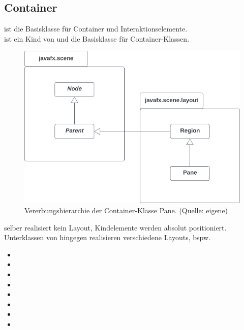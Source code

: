 \subsection{Container}

 ist die Basisklasse für Container und Interaktionselemente.\\

\noindent
{} ist ein Kind von  und die Basisklasse für Container-Klassen.

\begin{figure}
    \centering
    \includegraphics[scale=0.5]{chapters/fopt3/img/javafx/pane}
    \caption{Vererbungshierarchie der Container-Klasse Pane. (Quelle: eigene)}
    \label{fig:pane}
\end{figure}

\noindent
{} selber realisiert kein Layout, Kindelemente werden absolut positioniert.\\

\noindent
Unterklassen von  hingegen realisieren verschiedene Layouts, bspw.

\begin{itemize}
    \item {}
    \item {}
    \item {}
    \item {}
    \item {}
    \item {}
    \item {}
    \item {}
\end{itemize}


